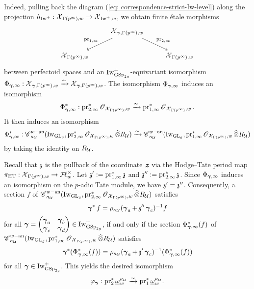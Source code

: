 Indeed, pulling back the diagram (\ref{eq: correspondence-strict-Iw-level}) along the projection $h_{\Iw^+}:\calX_{\Gamma(p^{\infty}), w}\rightarrow \calX_{\Iw^+, w}$, we obtain finite \'etale morphisms
$$
\begin{tikzcd}
& \calX_{\bfgamma, \Gamma(p^{\infty}), w}\arrow[ld, "\pr_{1, \infty}"']\arrow[rd, "\pr_{2, \infty}"] \\
\calX_{\Gamma(p^{\infty}),w} & & \calX_{\Gamma(p^{\infty}),w}
\end{tikzcd}
$$
between perfectoid spaces and an $\Iw_{\GSp_{2g}}^+$-equivariant isomorphism $\Phi_{\bfgamma, \infty}:\calX_{\bfgamma,\Gamma(p^{\infty}),w}\xrightarrow[]{\sim} \calX_{\bfgamma,\Gamma(p^{\infty}),w}$. The isomorphism $\Phi_{\bfgamma, \infty}$ induces an isomorphism
$$\Phi^*_{\bfgamma, \infty}:\pr_{2,\infty}^*\scrO_{\calX_{\Gamma(p^{\infty})}, w}\xrightarrow[]{\sim}\pr_{1,\infty}^*\scrO_{\calX_{\Gamma(p^{\infty})}, w}.$$
It then induces an isomorphism
$$\Phi^*_{\bfgamma, \infty}:\scrC^{w-\an}_{\kappa_{\calU}}(\Iw_{\GL_g}, \pr_{2,\infty}^*\scrO_{\calX_{\Gamma(p^{\infty})}, w}\widehat{\otimes}R_{\calU})\xrightarrow[]{\sim}\scrC^{w-\an}_{\kappa_{\calU}}(\Iw_{\GL_g}, \pr_{1,\infty}^*\scrO_{\calX_{\Gamma(p^{\infty})}, w}\widehat{\otimes}R_{\calU})$$
by taking the identity on $R_{\calU}$.

Recall that $\frakz$ is the pullback of the coordinate $\bfitz$ via the Hodge--Tate period map $\pi_{\HT}: \calX_{\Gamma(p^{\infty}), w}\rightarrow \adicFL^{\times}_w$. Let $\frakz':=\pr^*_{1, \infty}\frakz$ and $\frakz'':=\pr^*_{2, \infty}\frakz$. Since $\Phi_{\bfgamma, \infty}$ induces an isomorphism on the $p$-adic Tate module, we have $\frakz'=\frakz''$. Consequently, a section $f$ of $\scrC^{w-\an}_{\kappa_{\calU}}(\Iw_{\GL_g}, \pr_{2,\infty}^*\scrO_{\calX_{\Gamma(p^{\infty})}, w}\widehat{\otimes}R_{\calU})$ satisfies 
$$\bfgamma^*f=\rho_{\kappa_{\calU}}(\bfgamma_a+\frakz''\bfgamma_c)^{-1} f$$ for all $\bfgamma=\begin{pmatrix}\bfgamma_a & \bfgamma_b\\ \bfgamma_c & \bfgamma_d\end{pmatrix}\in \Iw_{\GSp_{2g}}^+$, if and only if the section $\Phi^*_{\bfgamma, \infty}(f)$ of $\scrC^{w-\an}_{\kappa_{\calU}}(\Iw_{\GL_g}, \pr_{1,\infty}^*\scrO_{\calX_{\Gamma(p^{\infty})}, w}\widehat{\otimes}R_{\calU})$ satisfies
$$\bfgamma^*(\Phi^*_{\bfgamma, \infty}(f))=\rho_{\kappa_{\calU}}(\bfgamma_a+\frakz'\bfgamma_c)^{-1} (\Phi^*_{\bfgamma, \infty}(f))$$ for all $\bfgamma\in \Iw^+_{\GSp_{2g}}$. This yields the desired isomorphism
$$\varphi_{\bfgamma}: \pr_2^*\underline{\omega}^{\kappa_{\calU}}_w\xrightarrow[]{\sim}\pr_1^*\underline{\omega}^{\kappa_{\calU}}_w.$$

